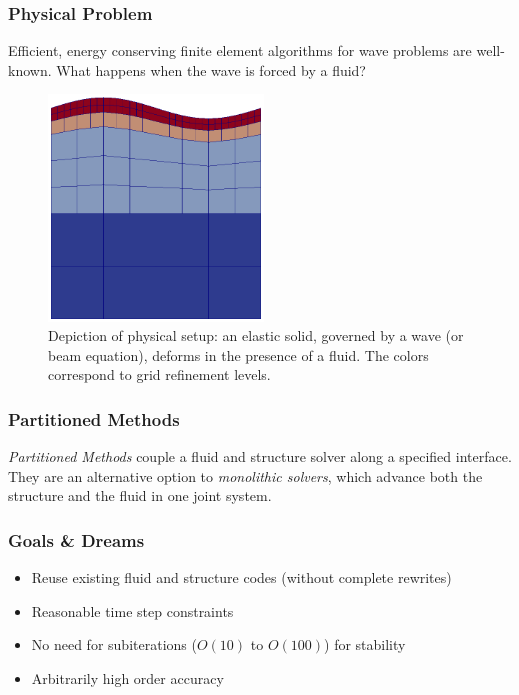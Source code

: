 \documentclass[8pt]{beamer}
\begin{document}
\begin{frame}
    \frametitle{Physical Problem}
    Efficient, energy conserving finite element algorithms for wave problems are
    well-known. What happens when the wave is forced by a fluid?

    \begin{figure}
        \centering
        \includegraphics[width=2.25in]{refined-roof-wave.png}

        \caption{Depiction of physical setup: an elastic solid, governed by a
        wave (or beam equation), deforms in the presence of a fluid. The colors
        correspond to grid refinement levels.}
    \end{figure}
\end{frame}

\begin{frame}
    \frametitle{Partitioned Methods}
    \emph{Partitioned Methods} couple a fluid and structure solver along a
    specified interface. They are an alternative option to \emph{monolithic
    solvers}, which advance both the structure and the fluid in one joint
    system.
\end{frame}

\begin{frame}
    \frametitle{Goals \& Dreams}
    \begin{itemize}
        \item Reuse existing fluid and structure codes (without complete
              rewrites)
        \item Reasonable time step constraints
        \item No need for subiterations (\(O(10)\) to \(O(100)\)) for stability
        \item Arbitrarily high order accuracy
    \end{itemize}
\end{frame}
\end{document}
